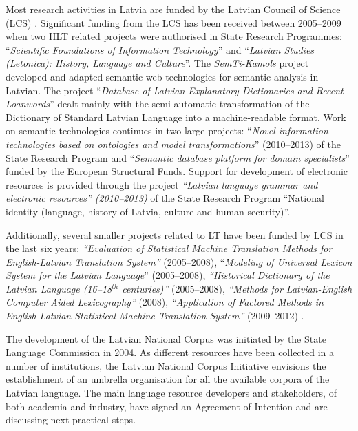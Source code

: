 \begin{multicols}{2}
Most research activities in Latvia are funded by the Latvian Council of Science (LCS) \cite{Meta2}.  Significant funding from the LCS has been received between 2005--2009 when two HLT related projects were authorised in State Research Programmes: ``\textit{Scientific Foundations of Information Technology}'' and ``\textit{Latvian Studies (Letonica): History, Language and Culture}''.  The \textit{SemTi-Kamols} project \cite{Meta39} developed and adapted semantic web technologies for semantic analysis in Latvian.  The project ``\textit{Database of Latvian Explanatory Dictionaries and Recent Loanwords}'' dealt mainly with the semi-automatic transformation of the Dictionary of Standard Latvian Language into a machine-readable format.  Work on semantic technologies continues in two large projects: ``\textit{Novel information technologies based on ontologies and model transformations}'' (2010--2013) of the State Research Program and ``\textit{Semantic database platform for domain specialists}'' funded by the European Structural Funds.  Support for development of electronic resources is provided through the project \textit{``Latvian language grammar and electronic resources'' (2010--2013)} of the State Research Program ``National identity (language, history of Latvia, culture and human security)''.

Additionally, several smaller projects related to LT have been funded by LCS in the last six years: \textit{``Evaluation of Statistical Machine Translation Methods for English-Latvian Translation System''} (2005--2008), ``\textit{Modeling of Universal Lexicon System for the Latvian Language}'' (2005--2008), \textit{``Historical Dictionary of the Latvian Language (16--18${}^{th}$ centuries)''} (2005--2008), \textit{``Methods for Latvian-English Computer Aided Lexicography''} (2008), \textit{``Application of Factored Methods in English-Latvian Statistical Machine Translation System''} (2009--2012) \cite{Meta27}.

The development of the Latvian National Corpus was initiated by the State Language Commission in 2004.
As different resources have been collected in a number of institutions, the Latvian National Corpus Initiative envisions the establishment of an umbrella organisation for all the available corpora of the Latvian language.
The main language resource developers and stakeholders, of both academia and industry, have signed an Agreement of Intention and are discussing next practical steps.


\end{multicols}
